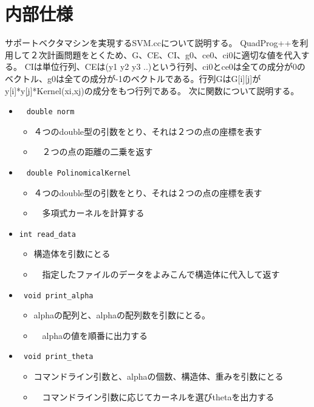 \documentclass[a4paper,12pt]{jarticle}
\begin{document}
\section{内部仕様}
サポートベクタマシンを実現するSVM.ccについて説明する。
QuadProg++を利用して２次計画問題をとくため、G、CE、CI、g0、ce0、ci0に適切な値を代入する。
CIは単位行列、CEは(y1 y2 y3 ..)という行列、ci0とce0は全ての成分が0のベクトル、g0は全ての成分が-1のベクトルである。行列GはG[i][j]がy[i]*y[j]*Kernel(xi,xj)の成分をもつ行列である。
次に関数について説明する。
\begin{itemize}
 \item \begin{verbatim}　double norm\end{verbatim}
   \begin{itemize}
     \item ４つのdouble型の引数をとり、それは２つの点の座標を表す
     \item　２つの点の距離の二乗を返す
   \end{itemize}
 \item \begin{verbatim}　double PolinomicalKernel\end{verbatim}
\begin{itemize}
     \item ４つのdouble型の引数をとり、それは２つの点の座標を表す
     \item　多項式カーネルを計算する
   \end{itemize}
 \item \begin{verbatim}int read_data\end{verbatim}
\begin{itemize}
     \item 構造体を引数にとる
     \item　指定したファイルのデータをよみこんで構造体に代入して返す
   \end{itemize}
 \item \begin{verbatim} void print_alpha\end{verbatim}
\begin{itemize}
     \item alphaの配列と、alphaの配列数を引数にとる。
     \item　alphaの値を順番に出力する
   \end{itemize}
 \item \begin{verbatim} void print_theta\end{verbatim}
\begin{itemize}
     \item コマンドライン引数と、alphaの個数、構造体、重みを引数にとる
     \item　コマンドライン引数に応じてカーネルを選びthetaを出力する
   \end{itemize}
 
\end{itemize}
\end{document}
